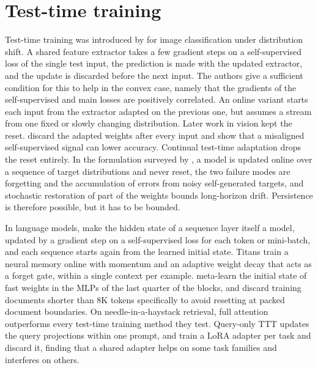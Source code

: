 \documentclass[12pt,a4paper]{report}
\begin{document}
\section{Test-time training}
\label{sec-lit-ttt}

Test-time training was introduced by \citet{sun2020ttt} for image classification under distribution shift. A shared feature extractor takes a few gradient steps on a self-supervised loss of the single test input, the prediction is made with the updated extractor, and the update is discarded before the next input. The authors give a sufficient condition for this to help in the convex case, namely that the gradients of the self-supervised and main losses are positively correlated. An online variant starts each input from the extractor adapted on the previous one, but assumes a stream from one fixed or slowly changing distribution. Later work in vision kept the reset. \citet{gandelsman2022ttt} discard the adapted weights after every input and show that a misaligned self-supervised signal can lower accuracy. Continual test-time adaptation drops the reset entirely. In the formulation surveyed by \citet{maharana2026continual}, a model is updated online over a sequence of target distributions and never reset, the two failure modes are forgetting and the accumulation of errors from noisy self-generated targets, and stochastic restoration of part of the weights bounds long-horizon drift. Persistence is therefore possible, but it has to be bounded.

In language models, \citet{sun2025learning} make the hidden state of a sequence layer itself a model, updated by a gradient step on a self-supervised loss for each token or mini-batch, and each sequence starts again from the learned initial state. Titans \citep{behrouz2025titans} train a neural memory online with momentum and an adaptive weight decay that acts as a forget gate, within a single context per example. \citet{tandon2025endtoend} meta-learn the initial state of fast weights in the MLPs of the last quarter of the blocks, and discard training documents shorter than 8K tokens specifically to avoid resetting at packed document boundaries. On needle-in-a-haystack retrieval, full attention outperforms every test-time training method they test. Query-only TTT \citep{bansal2025letsnot} updates the query projections within one prompt, and \citet{akyurek2025surprising} train a LoRA adapter per task and discard it, finding that a shared adapter helps on some task families and interferes on others.
\end{document}
